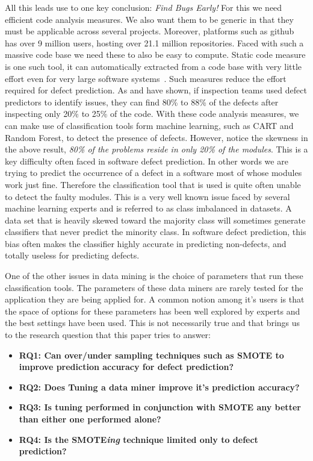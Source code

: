 \documentclass[12pt]{IEEEtran}
\begin{document}
All this leads use to one key conclusion: \textit{Find Bugs Early!} For this we need efficient code analysis measures. We also want them to be generic in that they must be applicable across several projects. Moreover, platforms such as github has over 9 million users, hosting over 21.1 million repositories. Faced with such a massive code base we need these to also be easy to compute. Static code measure is one such tool, it can automatically extracted from a code base with very little effort even for very large software systems~\cite{nagappan2005static}. Such measures reduce the effort required for defect prediction. As \cite{tosun2010ai} and \cite{ostrand2004bugs} have shown, if inspection teams used defect predictors to identify  issues, they can find 80\% to 88\% of the defects after inspecting only 20\% to 25\% of the code. With these code analysis measures, we can make use of classification tools form machine learning, such as CART and Random Forest, to detect the presence of defects. However, notice the skewness in the above result, \textit{ 80\% of the problems reside in only 20\% of the modules}. This is a key difficulty often faced in software defect prediction. In other words we are trying to predict the occurrence of a defect in a software most of whose modules work just fine. Therefore the classification tool that is used is quite often unable to detect the faulty modules. This is a very well known issue faced by several machine learning experts and is referred to as class imbalanced in datasets. A data set that is heavily skewed toward the majority class will sometimes generate classifiers that never predict the minority class. In software defect prediction, this bias often makes the classifier highly accurate in predicting non-defects, and totally useless for predicting defects.

One of the other issues in data mining is the choice of parameters that run these classification tools. The parameters of these data miners are rarely tested for the application they are being applied for. A common notion among it's users is that the space of options for these parameters has been well explored by experts and the best settings have been used. This is not necessarily true and that brings us to the research question that this paper tries to answer:
\begin{itemize}
\item[] {\bfseries RQ1:  Can over/under sampling techniques such as SMOTE to improve prediction accuracy for defect prediction?}
\item[] {\bfseries RQ2: Does Tuning a data miner improve it's prediction accuracy?}
\item[] {\bfseries RQ3: Is tuning performed in conjunction with SMOTE any better than either one performed alone?}
\item[] {\bfseries RQ4: Is the SMOTE\textit{ing} technique limited only to defect prediction?}
\end{itemize}
\end{document}
